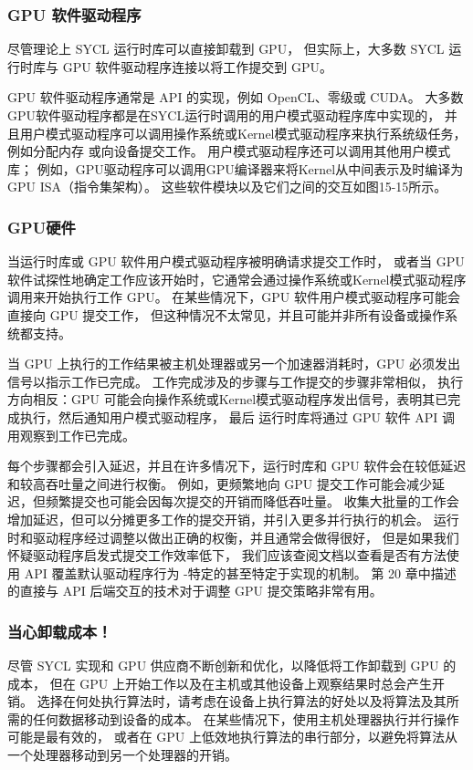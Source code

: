 \subsubsection{GPU 软件驱动程序}
尽管理论上 SYCL 运行时库可以直接卸载到 GPU，
但实际上，大多数 SYCL 运行时库与 GPU 软件驱动程序连接以将工作提交到 GPU。

GPU 软件驱动程序通常是 API 的实现，例如 OpenCL、零级或 CUDA。 
大多数GPU软件驱动程序都是在SYCL运行时调用的用户模式驱动程序库中实现的，
并且用户模式驱动程序可以调用操作系统或Kernel模式驱动程序来执行系统级任务，例如分配内存 或向设备提交工作。 
用户模式驱动程序还可以调用其他用户模式库； 
例如，GPU驱动程序可以调用GPU编译器来将Kernel从中间表示及时编译为GPU ISA（指令集架构）。 
这些软件模块以及它们之间的交互如图15-15所示。

\subsubsection{GPU硬件}
当运行时库或 GPU 软件用户模式驱动程序被明确请求提交工作时，
或者当 GPU 软件试探性地确定工作应该开始时，它通常会通过操作系统或Kernel模式驱动程序调用来开始执行工作 GPU。 
在某些情况下，GPU 软件用户模式驱动程序可能会直接向 GPU 提交工作，
但这种情况不太常见，并且可能并非所有设备或操作系统都支持。

当 GPU 上执行的工作结果被主机处理器或另一个加速器消耗时，GPU 必须发出信号以指示工作已完成。 
工作完成涉及的步骤与工作提交的步骤非常相似，
执行方向相反：GPU 可能会向操作系统或Kernel模式驱动程序发出信号，表明其已完成执行，然后通知用户模式驱动程序，
最后 运行时库将通过 GPU 软件 API 调用观察到工作已完成。

每个步骤都会引入延迟，并且在许多情况下，运行时库和 GPU 软件会在较低延迟和较高吞吐量之间进行权衡。 
例如，更频繁地向 GPU 提交工作可能会减少延迟，但频繁提交也可能会因每次提交的开销而降低吞吐量。 
收集大批量的工作会增加延迟，但可以分摊更多工作的提交开销，并引入更多并行执行的机会。 
运行时和驱动程序经过调整以做出正确的权衡，并且通常会做得很好，
但是如果我们怀疑驱动程序启发式提交工作效率低下，
我们应该查阅文档以查看是否有方法使用 API 覆盖默认驱动程序行为 -特定的甚至特定于实现的机制。 
第 20 章中描述的直接与 API 后端交互的技术对于调整 GPU 提交策略非常有用。

\subsubsection{当心卸载成本！}
尽管 SYCL 实现和 GPU 供应商不断创新和优化，以降低将工作卸载到 GPU 的成本，
但在 GPU 上开始工作以及在主机或其他设备上观察结果时总会产生开销。 
选择在何处执行算法时，请考虑在设备上执行算法的好处以及将算法及其所需的任何数据移动到设备的成本。 
在某些情况下，使用主机处理器执行并行操作可能是最有效的，
或者在 GPU 上低效地执行算法的串行部分，以避免将算法从一个处理器移动到另一个处理器的开销。

